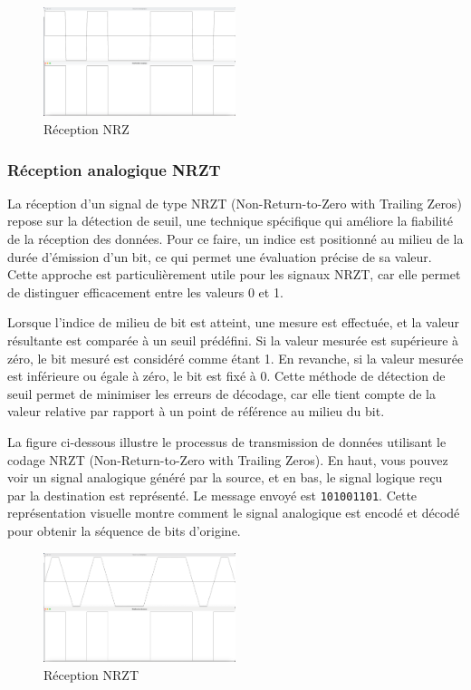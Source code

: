 \begin{figure}[H]
    \centering
    \includegraphics[width=0.5\textwidth]{img/etape2_reception_NRZ.png}
    \caption{Réception NRZ}
    \label{fig:teb1}
\end{figure}

\subsubsection{Réception analogique NRZT}

La réception d'un signal de type NRZT (Non-Return-to-Zero with Trailing Zeros) repose sur la détection de seuil, une technique spécifique qui améliore la fiabilité de la réception des données. Pour ce faire, un indice est positionné au milieu de la durée d'émission d'un bit, ce qui permet une évaluation précise de sa valeur. Cette approche est particulièrement utile pour les signaux NRZT, car elle permet de distinguer efficacement entre les valeurs 0 et 1.

Lorsque l'indice de milieu de bit est atteint, une mesure est effectuée, et la valeur résultante est comparée à un seuil prédéfini. Si la valeur mesurée est supérieure à zéro, le bit mesuré est considéré comme étant 1. En revanche, si la valeur mesurée est inférieure ou égale à zéro, le bit est fixé à 0. Cette méthode de détection de seuil permet de minimiser les erreurs de décodage, car elle tient compte de la valeur relative par rapport à un point de référence au milieu du bit.

La figure ci-dessous illustre le processus de transmission de données utilisant le codage NRZT (Non-Return-to-Zero with Trailing Zeros). En haut, vous pouvez voir un signal analogique généré par la source,  et en bas, le signal logique reçu par la destination est représenté. Le message envoyé est \texttt{101001101}. Cette représentation visuelle montre comment le signal analogique est encodé et décodé pour obtenir la séquence de bits d'origine. 

\begin{figure}[H]
    \centering
    \includegraphics[width=0.5\textwidth]{img/etape2_reception_NRZT.png}
    \caption{Réception NRZT}
    \label{fig:teb1}
\end{figure}

